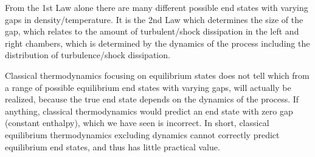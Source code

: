 From the 1st Law alone there are many different possible end states with varying
gaps in density/temperature. 
It is the 2nd Law which determines the size of the gap, which relates to the
amount of turbulent/shock dissipation
in the left and right chambers, which is determined by the dynamics of the
process including 
the distribution of turbulence/shock dissipation. 

Classical thermodynamics focusing on equilibrium states does not tell which from
a range of 
possible equilibrium end states with varying gaps, will actually be realized,
because the true end state depends on the dynamics
of the process. If anything, classical thermodynamics would predict an end state
with zero gap (constant enthalpy), which we have seen is incorrect.
In short, classical equilibrium thermodynamics excluding dynamics cannot
correctly
predict equilibrium end states, and thus has little practical value. 
  
